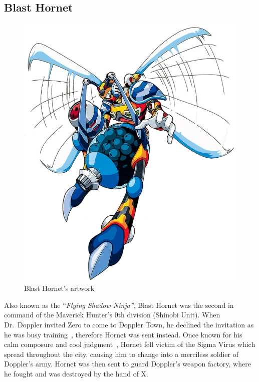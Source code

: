 \subsection{Blast Hornet}\label{boss:Blast_hornet}
\begin{figure}[htp]
	\centering
	\includegraphics[height=\portraitsize]{figures/X3/Blast_hornet/blasthornet.png}
	\caption{Blast Hornet's artwork~\cite{book:MMX_Complete_art}}
\end{figure}

Also known as the ``\textit{Flying Shadow Ninja''}, Blast Hornet was the second in command of the Maverick Hunter's 0th division (Shinobi Unit). When Dr.~Doppler invited Zero to come to Doppler Town, he declined the invitation as he was busy training~\cite{wayback:X3_resources}, therefore Hornet was sent instead. Once known  for his calm composure and cool judgment~\cite{wiki:Blast_hornet}, Hornet fell victim of the Sigma Virus which spread throughout the city, causing him to change into a merciless soldier of Doppler's army. Hornet was then sent to guard Doppler's weapon factory, where he fought and was destroyed by the hand of X.

